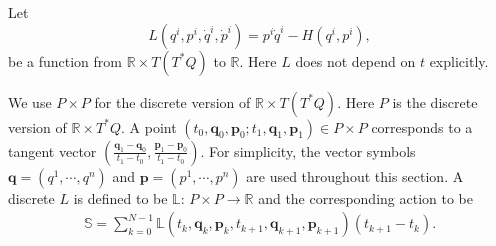 \documentclass[a4paper,a4paper]{article}
\def\q{\boldsymbol{q}}
\def\p{\boldsymbol{p}}
\begin{document}
 Let
\[
            L(q^{i}, p^{i}, \dot{q}^{i}, \dot{p}^{i})=p^{i}\dot{q}^{i}
                     -H(q^{i}, p^{i}),
\]
be a function from $\mathbb{R}\times T(T^{*}Q)$ to $\mathbb{R}$.
Here $L$  does not depend on $t$ explicitly.

We use $P\times P$ for the discrete version  of $\mathbb{R}\times
T(T^{*}Q)$. Here $P$ is the discrete version of $\mathbb{R}\times
T^{*}Q$. A point $(t_{0}, \q_{0}, \p_{0}; t_{1}, \q_{1},
\p_{1})\in P\times P$ corresponds to a tangent vector
$(\frac{\q_{1}-\q_{0}}{t_{1}-t_{0}}, \frac{\p_{1}-\p_{0}}
{t_{1}-t_{0}})$. For simplicity, the vector symbols $\q=(q^{1},
\cdots, q^{n})$ and $\p=(p^{1}, \cdots, p^{n})$ are used
throughout this section. A discrete $L$ is defined to be
$\mathbb{L}:\,P\times P\to \mathbb{R}$ and the corresponding
action to be
\begin{align}
 \mathbb{S}=\sum_{k=0}^{N-1}\mathbb{L}(t_{k}, \q_{k}, \p_{k}, t_{k+1}, \q_{k+1},
             \p_{k+1})(t_{k+1}-t_{k}). \label{3.1}
\end{align}
\end{document}

